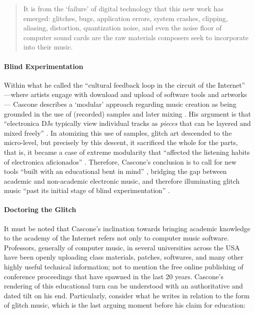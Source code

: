 \begin{quote}
	It is from the `failure' of digital technology that this new work has emerged: glitches, bugs, application errors, system crashes, clipping, aliasing, distortion, quantization noise, and even the noise floor of computer sound cards are the raw materials composers seek to incorporate into their music. \parencite[13]{Cas00:The}
\end{quote}

\paragraph{Blind Experimentation}
Within what he called the ``cultural feedback loop in the circuit of the Internet'' ---where artists engage with download and upload of software tools and artworks--- Cascone describes a `modular' approach regarding music creation as being grounded in the use of (recorded) samples and later mixing \parencite[17]{Cas00:The}. His argument is that ``electronica DJs typically view individual tracks as \textit{pieces} that can be layered and mixed freely'' \im \parencite[17]{Cas00:The}. In atomizing this use of samples, glitch art descended to the micro-level, but precisely by this descent, it sacrificed the whole for the parts, that is, it became a case of extreme modularity that ``affected the listening habits of electronica aficionados'' \parencite[17]{Cas00:The}. Therefore, Cascone's conclusion is to call for new tools ``built with an educational bent in mind'' \parencite[17]{Cas00:The}, bridging the gap between academic and non-academic electronic music, and therefore illuminating glitch music ``past its initial stage of blind experimentation'' \parencite[17]{Cas00:The}. 

\paragraph{Doctoring the Glitch}
It must be noted that Cascone's inclination towards bringing academic knowledge to the academy of the Internet refers not only to computer music software. Professors, generally of computer music, in several universities across the USA have been openly uploading class materials, patches, softwares, and many other highly useful technical information; not to mention the free online publishing of conference proceedings that have spawned in the last 20 years. Cascone's rendering of this educational turn can be understood with an authoritative and dated tilt on his end. Particularly, consider what he writes in relation to the form of glitch music, which is the last arguing moment before his claim for education:

